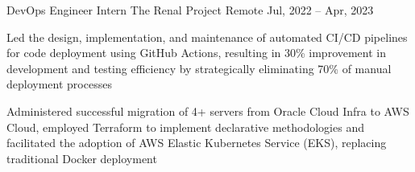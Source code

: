 \documentclass[]{awesome-cv}
\begin{document}
\begin{cventries}
    \cventry
    {DevOps Engineer Intern}
    {The Renal Project}
    {Remote}
    {Jul, 2022 – Apr, 2023}
    {\begin{cvitems}
            \item {Led the design, implementation, and maintenance of automated CI/CD pipelines for code deployment using GitHub Actions, resulting in 30\% improvement in development and testing efficiency by strategically eliminating 70\% of manual deployment processes}
            \item {Administered successful migration of 4+ servers from Oracle Cloud Infra to AWS Cloud, employed Terraform to implement declarative methodologies and facilitated the adoption of AWS Elastic Kubernetes Service (EKS), replacing traditional Docker deployment}
        \end{cvitems}}
\end{cventries}
\vspace{-5mm}
\end{document}
